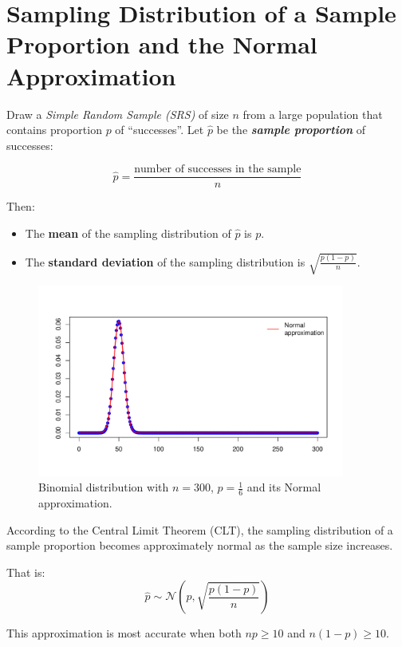 \section{Sampling Distribution of a Sample Proportion and the Normal Approximation}

Draw a \textit{Simple Random Sample (SRS)} of size \( n \) from a large population that contains proportion \( p \) of “successes”. Let \( \hat{p} \) be the \textbf{\textit{sample proportion}} of successes:

\[
\hat{p} = \frac{\text{number of successes in the sample}}{n}
\]

Then:

\begin{itemize}
  \item The \textbf{mean} of the sampling distribution of \( \hat{p} \) is \( p \).
  \item The \textbf{standard deviation} of the sampling distribution is \( \sqrt{ \frac{p(1 - p)}{n} } \).
\end{itemize}


\begin{figure}[h!]
  \centering
  \includegraphics[width=0.9\textwidth]{Section4/binomial_normal.pdf}
  \caption{Binomial distribution with \(n = 300\), \(p = \frac{1}{6}\) and its Normal approximation.}
\end{figure}


According to the Central Limit Theorem (CLT), the sampling distribution of a sample proportion becomes approximately normal as the sample size increases.

That is:
\[
\hat{p} \sim \mathcal{N}\left(p, \sqrt{\frac{p(1 - p)}{n}}\right)
\]

This approximation is most accurate when both \( np \geq 10 \) and \( n(1 - p) \geq 10 \).

